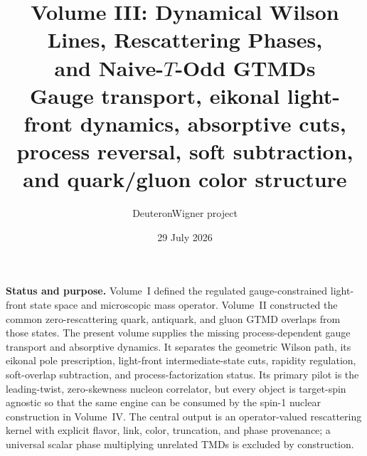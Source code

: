 \documentclass[11pt]{article}
\title{\vspace{-1.0cm}
{\color{navy}\bfseries Volume III: Dynamical Wilson Lines, Rescattering Phases,\\[2mm]
and Naive-\(T\)-Odd GTMDs}\\[4mm]
\large Gauge transport, eikonal light-front dynamics, absorptive cuts,\\
process reversal, soft subtraction, and quark/gluon color structure}
\author{DeuteronWigner project}
\date{29 July 2026}
\begin{document}
\maketitle

\begin{center}
\begin{minipage}{0.94\textwidth}
\colorbox{softblue}{\parbox{0.96\textwidth}{
\textbf{Status and purpose.}
Volume~I defined the regulated gauge-constrained light-front state space and
microscopic mass operator.  Volume~II constructed the common zero-rescattering
quark, antiquark, and gluon GTMD overlaps from those states.  The present
volume supplies the missing process-dependent gauge transport and absorptive
dynamics.  It separates the geometric Wilson path, its eikonal pole
prescription, light-front intermediate-state cuts, rapidity regulation,
soft-overlap subtraction, and process-factorization status.  Its primary
pilot is the leading-twist, zero-skewness nucleon correlator, but every object
is target-spin agnostic so that the same engine can be consumed by the
spin-1 nuclear construction in Volume~IV.  The central output is an
operator-valued rescattering kernel with explicit flavor, link, color,
truncation, and phase provenance; a universal scalar phase multiplying
unrelated TMDs is excluded by construction.
}}
\end{minipage}
\end{center}
\end{document}
